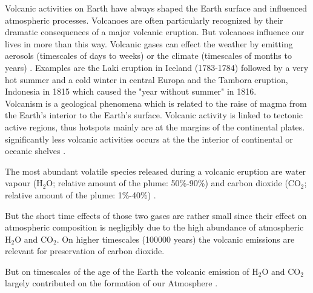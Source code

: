 
Volcanic activities on Earth have always shaped the Earth  surface and influenced atmospheric processes. Volcanoes are often particularly recognized by their dramatic consequences of a major volcanic eruption. But volcanoes influence our lives in more than this way. Volcanic gases can effect the weather by emitting aerosols (timescales of days to weeks) or the climate (timescales of months to years) \citet{schmidt2015volcanismarticle}.
Examples are the Laki eruption in Iceland (1783-1784) followed by a very hot summer and a cold winter in central Europa \citet{thordarson2003atmospheric} and the Tambora eruption, Indonesia in 1815 which caused the "year without summer" in 1816.\\
%
\newline
%
Volcanism is a geological phenomena which is related to the raise of magma  from the Earth's  interior to the Earth's  surface. Volcanic activity is linked to tectonic active regions, thus hotspots mainly are at the margins of the continental plates.
significantly less volcanic activities occurs at the the interior of continental or oceanic shelves \citet{schmincke2000vulkanismus}.

The most abundant volatile species released during a volcanic eruption are water vapour (H$_2$O; relative amount of the plume: 50\%-90\%) and carbon dioxide (CO$_2$; relative amount of the plume: 1\%-40\%) \citet{platt2015quantification}. 

But the short time effects of those two gases are rather small since their effect on atmospheric composition is negligibly due to the high abundance of atmospheric H$_2$O and CO$_2$. 
On higher timescales (100000 years) the volcanic emissions are relevant for preservation of carbon dioxide. 

But on timescales of the age of the Earth  the volcanic emission of H$_2$O and CO$_2$ largely contributed on the formation of our Atmosphere \citet{schmidt2015volcanism}.\\ 

